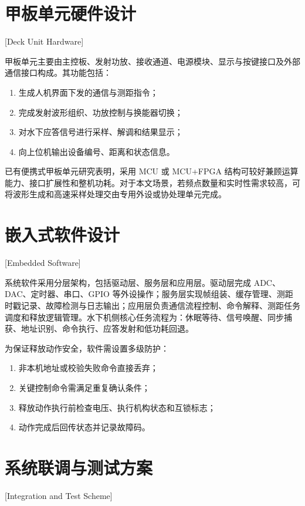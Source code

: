 \section{甲板单元硬件设计}[Deck Unit Hardware]

甲板单元主要由主控板、发射功放、接收通道、电源模块、显示与按键接口及外部通信接口构成。其功能包括：

\begin{enumerate}
  \item 生成人机界面下发的通信与测距指令；
  \item 完成发射波形组织、功放控制与换能器切换；
  \item 对水下应答信号进行采样、解调和结果显示；
  \item 向上位机输出设备编号、距离和状态信息。
\end{enumerate}

已有便携式甲板单元研究表明，采用 MCU 或 MCU+FPGA 结构可较好兼顾运算能力、接口扩展性和整机功耗\cite{zhangDesignImplementationPortable2018,CaoMingChengJiYuSTM32H7DeDuoGongNengBianXiShiJiaBanDanYuanYanJiuSheJi2021}。对于本文场景，若频点数量和实时性需求较高，可将波形生成和高速采样处理交由专用外设或协处理单元完成。

\section{嵌入式软件设计}[Embedded Software]

系统软件采用分层架构，包括驱动层、服务层和应用层。驱动层完成 ADC、DAC、定时器、串口、GPIO 等外设操作；服务层实现帧组装、缓存管理、测距时戳记录、故障检测与日志输出；应用层负责通信流程控制、命令解释、测距任务调度和释放逻辑管理。水下机侧核心任务流程为：休眠等待、信号唤醒、同步捕获、地址识别、命令执行、应答发射和低功耗回退。

为保证释放动作安全，软件需设置多级防护：

\begin{enumerate}
  \item 非本机地址或校验失败命令直接丢弃；
  \item 关键控制命令需满足重复确认条件；
  \item 释放动作执行前检查电压、执行机构状态和互锁标志；
  \item 动作完成后回传状态并记录故障码。
\end{enumerate}

\section{系统联调与测试方案}[Integration and Test Scheme]

